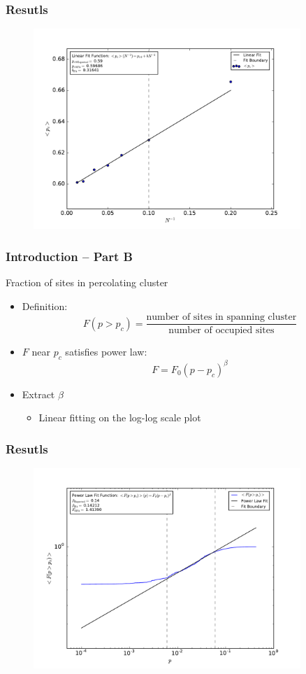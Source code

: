\documentclass[mathserif,18pt,xcolor=table]{beamer}
\begin{document}
\begin{frame}
	\frametitle{Resutls}
	\begin{figure}
  	\centering
  	\includegraphics[width=0.9\textwidth]{../output/plots_for_paper/pc_ave_vs_InverseN.pdf}
	\end{figure}
\end{frame}


\begin{frame}
	\frametitle{Introduction -- Part B}
	Fraction of sites in percolating cluster
	\begin{itemize}
		\item Definition:
			\begin{equation}
			F(p>p_c)=\frac{\text{number of sites in spanning cluster}}{\text{number of occupied sites}}
			\end{equation}
		\item $F$ near $p_c$ satisfies power law:
			\begin{equation}
			F=F_0(p-p_c)^\beta
			\end{equation}
		\item Extract $\beta$
			\begin{itemize}
				\item Linear fitting on the log-log scale plot
			\end{itemize}
	\end{itemize}
\end{frame}


\begin{frame}
	\frametitle{Resutls}
	\begin{figure}
  	\centering
  	\includegraphics[width=0.9\textwidth]{../output/plots_for_paper/F_ave_vs_p.pdf}
	\end{figure}
\end{frame}
\end{document}
